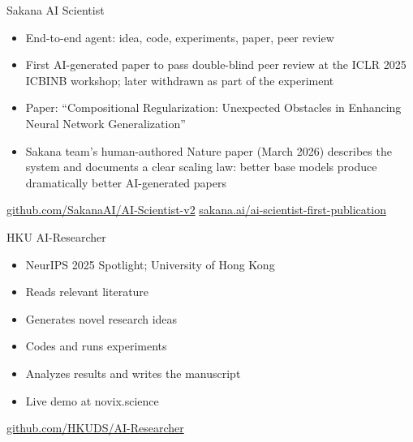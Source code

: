 \documentclass[aspectratio=169]{beamer}
\begin{document}
\begin{frame}{Sakana AI Scientist}
    \begin{itemize}
        \item End-to-end agent: idea, code, experiments, paper, peer review
        \vspace{0.3em}
        \item First AI-generated paper to pass double-blind peer review at the ICLR 2025 ICBINB workshop; later withdrawn as part of the experiment
        \vspace{0.3em}
        \item Paper: ``Compositional Regularization: Unexpected Obstacles in Enhancing Neural Network Generalization''
        \vspace{0.3em}
        \item Sakana team's human-authored Nature paper (March 2026) describes the system and documents a clear scaling law: better base models produce dramatically better AI-generated papers
    \end{itemize}
    \vspace{0.4em}
    \footnotesize \url{github.com/SakanaAI/AI-Scientist-v2} \quad \url{sakana.ai/ai-scientist-first-publication}
\end{frame}

\begin{frame}{HKU AI-Researcher}
    \begin{itemize}
        \item NeurIPS 2025 Spotlight; University of Hong Kong
        \vspace{0.3em}
        \item Reads relevant literature
        \vspace{0.3em}
        \item Generates novel research ideas
        \vspace{0.3em}
        \item Codes and runs experiments
        \vspace{0.3em}
        \item Analyzes results and writes the manuscript
        \vspace{0.3em}
        \item Live demo at novix.science
    \end{itemize}
    \vspace{0.4em}
    \footnotesize \url{github.com/HKUDS/AI-Researcher}
\end{frame}
\end{document}
